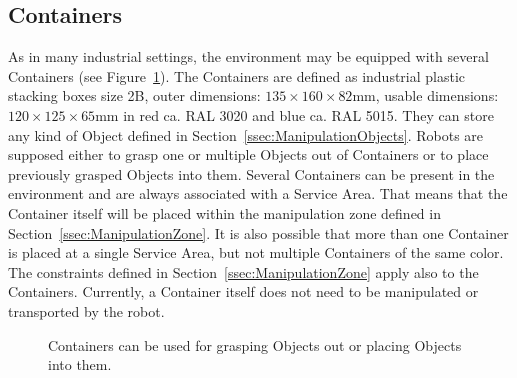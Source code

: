 





\subsection{Containers}
As in many industrial settings, the \RCAW environment may be equipped with several Containers (see Figure~\ref{fig:containers}). The Containers are defined as industrial plastic stacking boxes size 2B, outer dimensions: $135 \times 160 \times 82  \si{\milli\meter}$, usable dimensions: $120 \times 125 \times 65  \si{\milli\meter}$  in red ca. RAL 3020 and blue ca. RAL 5015.
They can store any kind of Object defined in Section~\ref{ssec:ManipulationObjects}. Robots are supposed either to grasp one or multiple Objects out of Containers or to place previously grasped Objects into them. Several Containers can be present in the environment and are always associated with a Service Area. That means that the Container itself will be placed within the manipulation zone defined in Section~\ref{ssec:ManipulationZone}.
It is also possible that more than one Container is placed at a single Service Area, but not multiple Containers of the same color.
The constraints defined in Section~\ref{ssec:ManipulationZone} apply also to the Containers.
Currently, a Container itself does not need to be manipulated or transported by the robot.

\begin{figure} [h!]
	\begin{center}
		\hspace{0.05\textwidth}
	\end{center}
	\caption{Containers can be used for grasping Objects out or placing Objects into them.}
	\label{fig:containers}
\end{figure}




